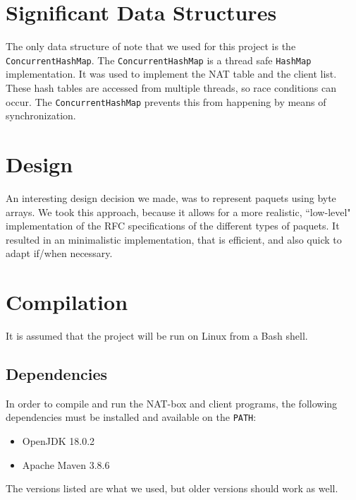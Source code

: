 \documentclass[10pt, a4paper]{article}
\begin{document}

\section{Significant Data Structures}
\label{sec:sigds}

The only data structure of note that we used for this project is the
\texttt{ConcurrentHashMap}. The \texttt{ConcurrentHashMap} is a thread safe
\texttt{HashMap} implementation. It was used to implement the NAT table and the
client list. These hash tables are accessed from multiple threads, so race
conditions can occur. The \texttt{ConcurrentHashMap} prevents this from
happening by means of synchronization.



\section{Design}
\label{sec:design}

An interesting design decision we made, was to represent paquets using byte
arrays. We took this approach, because it allows for a more realistic,
``low-level" implementation of the RFC specifications of the different types of
paquets. It resulted in an minimalistic implementation, that is efficient, and
also quick to adapt if/when necessary.



\section{Compilation}
\label{sec:comp}

It is assumed that the project will be run on Linux from a Bash shell.


\subsection{Dependencies}
\label{ssec:deps}

In order to compile and run the NAT-box and client programs, the following
dependencies must be installed and available on the \texttt{PATH}:
\begin{itemize}
  \item OpenJDK 18.0.2
  \item Apache Maven 3.8.6
\end{itemize}
The versions listed are what we used, but older versions should work as well.
\end{document}
